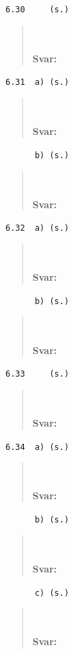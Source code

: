 \documentclass[a4paper]{article}
\newcommand{\tskcol}[1]{\textcolor{tskcol}{#1}}
\begin{document}
	\texttt{\tskcol{6.30~~~~ (s.)}}
	\begin{quotation}
		\noindent
		\\ \\
		\textbf{Svar:}
	\end{quotation}
	
	\texttt{\tskcol{6.31~~a) (s.)}}
	\begin{quotation}
		\noindent
		\\ \\
		\textbf{Svar:}
	\end{quotation}
	
	\texttt{\tskcol{~~~~~~b) (s.)}}
	\begin{quotation}
		\noindent
		\\ \\
		\textbf{Svar:}
	\end{quotation}
	
	\texttt{\tskcol{6.32~~a) (s.)}}
	\begin{quotation}
		\noindent
		\\ \\
		\textbf{Svar:}
	\end{quotation}
	
	\texttt{\tskcol{~~~~~~b) (s.)}}
	\begin{quotation}
		\noindent
		\\ \\
		\textbf{Svar:}
	\end{quotation}
	
	\texttt{\tskcol{6.33~~~~ (s.)}}
	\begin{quotation}
		\noindent
		\\ \\
		\textbf{Svar:}
	\end{quotation}
	
	\texttt{\tskcol{6.34~~a) (s.)}}
	\begin{quotation}
		\noindent
		\\ \\
		\textbf{Svar:}
	\end{quotation}
	
	\texttt{\tskcol{~~~~~~b) (s.)}}
	\begin{quotation}
		\noindent
		\\ \\
		\textbf{Svar:}
	\end{quotation}
	
	\texttt{\tskcol{~~~~~~c) (s.)}}
	\begin{quotation}
		\noindent
		\\ \\
		\textbf{Svar:}
	\end{quotation}
	
\end{document}
